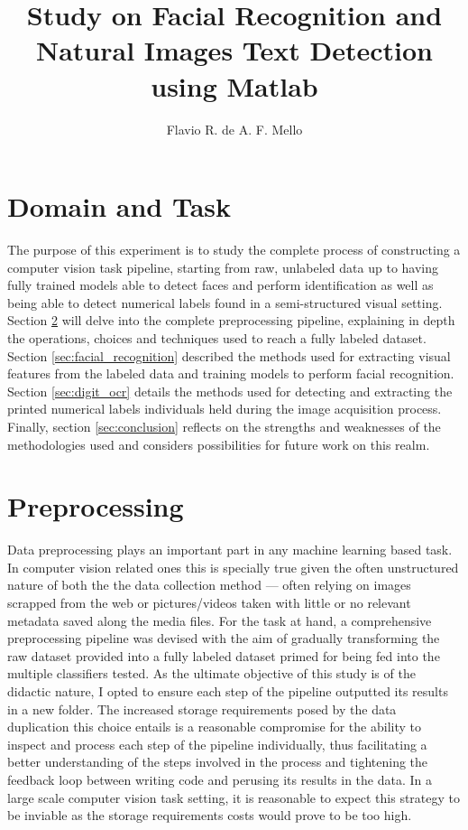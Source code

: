 \documentclass[11pt]{article}
\title{Study on Facial Recognition and Natural Images Text Detection using Matlab}
\author{Flavio R. de A. F. Mello}
\begin{document}
\maketitle

\section{Domain and Task}
    The purpose of this experiment is to study the complete process of constructing a computer vision task pipeline, starting from raw, unlabeled data up to having fully trained models able to detect faces and perform identification as well as being able to detect numerical labels found in a semi-structured visual setting. Section \ref{sec:preprocessing} will delve into the complete preprocessing pipeline, explaining in depth the operations, choices and techniques used to reach a fully labeled dataset. Section \ref{sec:facial_recognition} described the methods used for extracting visual features from the labeled data and training models to perform facial recognition. Section \ref{sec:digit_ocr} details the methods used for detecting and extracting the printed numerical labels individuals held during the image acquisition process. Finally, section \ref{sec:conclusion} reflects on the strengths and weaknesses of the methodologies used and considers possibilities for future work on this realm.

\section{Preprocessing}\label{sec:preprocessing}
    Data preprocessing plays an important part in any machine learning based task. In computer vision related ones this is specially true given the often unstructured nature of both the the data collection method --- often relying on images scrapped from the web or pictures/videos taken with little or no relevant metadata saved along the media files. For the task at hand, a comprehensive preprocessing pipeline was devised with the aim of gradually transforming the raw dataset provided into a fully labeled dataset primed for being fed into the multiple classifiers tested. As the ultimate objective of this study is of the didactic nature, I opted to ensure each step of the pipeline outputted its results in a new folder. The increased storage requirements posed by the data duplication this choice entails is a reasonable compromise for the ability to inspect and process each step of the pipeline individually, thus facilitating a better understanding of the steps involved in the process and tightening the feedback loop between writing code and perusing its results in the data. In a large scale computer vision task setting, it is reasonable to expect this strategy to be inviable as the storage requirements costs would prove to be too high.
\end{document}
